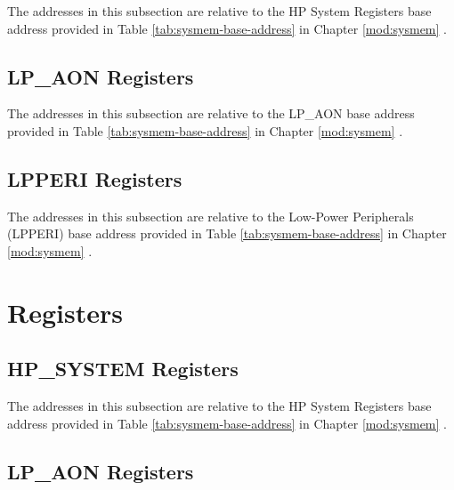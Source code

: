 \documentclass[main\_\_EN.tex]{subfiles}
\begin{document}
The addresses in this subsection are relative to the HP System Registers base address provided in Table \ref{tab:sysmem-base-address} in Chapter \ref{mod:sysmem} \textit{}.



\subsection{LP\_AON Registers}
\label{sec:sysreg-reg-summ-lpaon}

The addresses in this subsection are relative to the LP\_AON base address provided in Table \ref{tab:sysmem-base-address} in Chapter \ref{mod:sysmem} \textit{}.



\subsection{LPPERI Registers}
\label{sec:sysreg-reg-summ-lpperi}

The addresses in this subsection are relative to the Low-Power Peripherals (LPPERI) base address provided in Table \ref{tab:sysmem-base-address} in Chapter \ref{mod:sysmem} \textit{}.





\clearpage
\section{Registers}

\subsection{HP\_SYSTEM Registers}
\label{sec:sysreg-reg-sysreg}

The addresses in this subsection are relative to the HP System Registers base address provided in Table \ref{tab:sysmem-base-address} in Chapter \ref{mod:sysmem} \textit{}.



\subsection{LP\_AON Registers}
\label{sec:sysreg-reg-lpaon}
\end{document}
